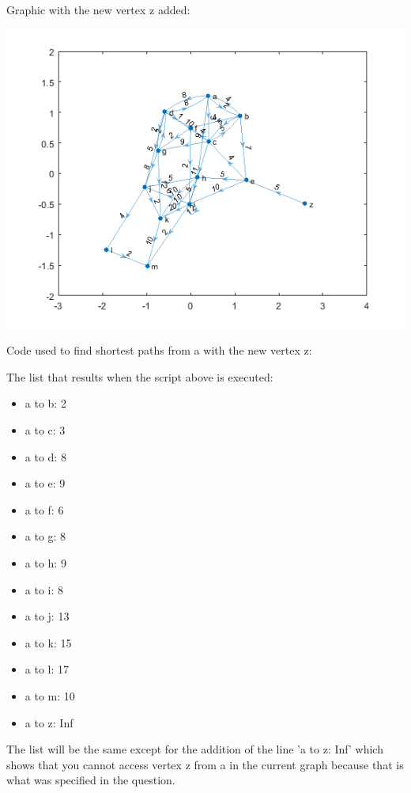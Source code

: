 \documentclass[../report/main.tex]{subfiles}
\begin{document}
\begin{enumerate}[a)]
    Graphic with the new vertex z added:

    \includegraphics{../problem_three/problem3_digraph_with_z.png}

    Code used to find shortest paths from a with the new vertex z:
  
    

    The list that results when the script above is executed:

    \begin{itemize}
        \item a to b: 2
        \item a to c: 3
        \item a to d: 8
        \item a to e: 9
        \item a to f: 6
        \item a to g: 8
        \item a to h: 9
        \item a to i: 8
        \item a to j: 13
        \item a to k: 15
        \item a to l: 17
        \item a to m: 10
        \item a to z: Inf
    \end{itemize}

    The list will be the same except for the addition of the line 'a to z: Inf' which shows that you cannot access vertex z from a in the current graph because that is what was specified in the question.


\end{enumerate}
\end{document}
